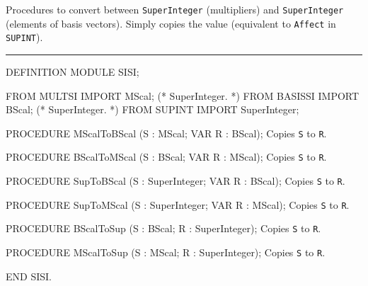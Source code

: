 
Procedures to convert between {\tt SuperInteger} (multipliers) and
{\tt SuperInteger} (elements of basis vectors).
Simply copies the value (equivalent to {\tt Affect} in {\tt SUPINT}).

\bigskip\hrule
\code

DEFINITION MODULE SISI;

FROM MULTSI  IMPORT MScal;             (* SuperInteger.                   *)
FROM BASISSI IMPORT BScal;             (* SuperInteger.                   *)
FROM SUPINT  IMPORT SuperInteger;

PROCEDURE MScalToBScal (S : MScal;  VAR R : BScal);
\endcode
  \tab  Copies {\tt S} to {\tt R}.\endtab
\code

PROCEDURE BScalToMScal (S : BScal;  VAR R : MScal);
\endcode
  \tab  Copies {\tt S} to {\tt R}.\endtab
\code

PROCEDURE SupToBScal (S : SuperInteger; VAR R : BScal);
\endcode
  \tab Copies {\tt S} to {\tt R}.\endtab
\code

PROCEDURE SupToMScal (S : SuperInteger; VAR R : MScal);
\endcode
  \tab Copies {\tt S} to {\tt R}.\endtab
\code

PROCEDURE BScalToSup (S : BScal; R : SuperInteger);
\endcode
  \tab Copies {\tt S} to {\tt R}.\endtab
\code

PROCEDURE MScalToSup (S : MScal; R : SuperInteger);
\endcode
  \tab Copies {\tt S} to {\tt R}.\endtab
\code

END SISI.
\endcode
